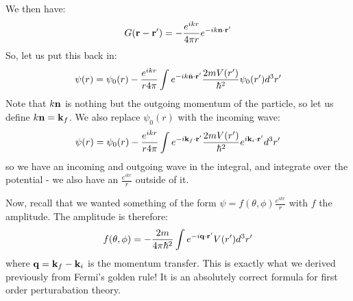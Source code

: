 We then have:
\begin{equation}
    G(\mathbf{r} - \mathbf{r}') = - \frac{e^{ikr}}{4\pi r}e^{-ik\mathbf{n} \cdot \mathbf{r}'}
\end{equation}
So, let us put this back in:
\begin{equation}
    \psi(r) = \psi_0(r) - \frac{e^{ikr}}{r4\pi} \int e^{-ik\hat{\mathbf{n}} \cdot \mathbf{r}'} \frac{2mV(r')}{\hbar^2}\psi_0(r')d^3r'
\end{equation}
Note that $k\mathbf{n}$ is nothing but the outgoing momentum of the particle, so let us define $k\mathbf{n} = \mathbf{k}_f$. We also replace $\psi_0(r)$ with the incoming wave:
\begin{equation}
    \psi(r) = \psi_0(r) - \frac{e^{ikr}}{r4\pi} \int e^{-i\mathbf{k}_f \cdot \mathbf{r}'} \frac{2mV(r')}{\hbar^2}e^{i\mathbf{k}_i \cdot \mathbf{r}'}d^3r'
\end{equation}
so we have an incoming and outgoing wave in the integral, and integrate over the potential - we also have an $\frac{e^{ikr}}{r}$ outside of it.

Now, recall that we wanted something of the form $\psi = f(\theta, \phi) \frac{e^{ikr}}{r}$ with $f$ the amplitude. The amplitude is therefore:
\begin{equation}
    f(\theta, \phi) = -\frac{2m}{4\pi\hbar^2}\int e^{-i\v{q} \cdot \v{r}'}V(r')d^3r'
\end{equation}
where $\mathbf{q} = \mathbf{k}_f - \mathbf{k}_i$ is the momentum transfer. This is exactly what we derived previously from Fermi's golden rule! It is an absolutely correct formula for first order perturabation theory.